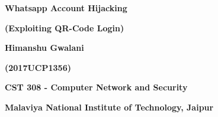 \documentclass[12pt]{report}
\renewcommand{\_}{\kern-1.5pt\textunderscore\kern-1.5pt}
\begin{document}
\begin{Center}
{\fontsize{18pt}{21.6pt}\selectfont \textbf{Whatsapp Account Hijacking}\par}
\end{Center}\par

\begin{Center}
{\fontsize{18pt}{21.6pt}\selectfont \textbf{(Exploiting QR-Code Login)}\par}
\end{Center}\par


\vspace{\baselineskip}
\begin{Center}
{\fontsize{16pt}{19.2pt}\selectfont \textbf{Himanshu Gwalani}\par}
\end{Center}\par

\begin{Center}
{\fontsize{16pt}{19.2pt}\selectfont \textbf{(2017UCP1356)}\par}
\end{Center}\par


\vspace{\baselineskip}

\vspace{\baselineskip}
\begin{Center}
{\fontsize{14pt}{16.8pt}\selectfont \textbf{CST 308 - Computer Network and Security}\par}
\end{Center}\par

\begin{Center}
{\fontsize{14pt}{16.8pt}\selectfont \textbf{Malaviya National Institute of Technology, Jaipur}\par}
\end{Center}\par


\vspace{\baselineskip}

\vspace{\baselineskip}

\vspace{\baselineskip}

\vspace{\baselineskip}

\vspace{\baselineskip}
\end{document}
